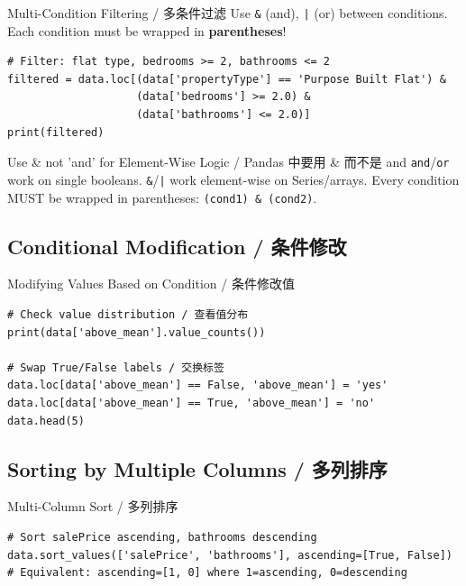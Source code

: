 \documentclass[11pt,a4paper]{report}
\let\oldtexttt\texttt
\renewcommand{\texttt}[1]{\textcolor{mainblue}{\oldtexttt{#1}}}
\begin{document}
\begin{examplebox}{Multi-Condition Filtering / 多条件过滤}
    Use \texttt{\&} (and), \texttt{|} (or) between conditions. Each condition must be wrapped in \textbf{parentheses}!
\begin{lstlisting}
# Filter: flat type, bedrooms >= 2, bathrooms <= 2
filtered = data.loc[(data['propertyType'] == 'Purpose Built Flat') &
                    (data['bedrooms'] >= 2.0) &
                    (data['bathrooms'] <= 2.0)]
print(filtered)
\end{lstlisting}
\end{examplebox}

\begin{warning}{Use \& not 'and' for Element-Wise Logic / Pandas 中要用 \& 而不是 and}
    \texttt{and}/\texttt{or} work on single booleans. \texttt{\&}/\texttt{|} work element-wise on Series/arrays. Every condition MUST be wrapped in parentheses: \texttt{(cond1) \& (cond2)}.
\end{warning}

\subsection{Conditional Modification / 条件修改}

\begin{examplebox}{Modifying Values Based on Condition / 条件修改值}
\begin{lstlisting}
# Check value distribution / 查看值分布
print(data['above_mean'].value_counts())

# Swap True/False labels / 交换标签
data.loc[data['above_mean'] == False, 'above_mean'] = 'yes'
data.loc[data['above_mean'] == True, 'above_mean'] = 'no'
data.head(5)
\end{lstlisting}
\end{examplebox}

\subsection{Sorting by Multiple Columns / 多列排序}

\begin{examplebox}{Multi-Column Sort / 多列排序}
\begin{lstlisting}
# Sort salePrice ascending, bathrooms descending
data.sort_values(['salePrice', 'bathrooms'], ascending=[True, False])
# Equivalent: ascending=[1, 0] where 1=ascending, 0=descending
\end{lstlisting}
\end{examplebox}
\end{document}

